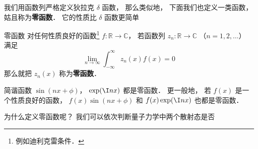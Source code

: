 
\begin{issues}
\issueDraft
{}
\end{issues}

我们用函数列严格定义狄拉克 $\delta$ 函数， 那么类似地， 下面我们也定义一类函数， 姑且称为\textbf{零函数}． 它的性质比 $\delta$ 函数更简单
\begin{definition}{零函数}
对任何性质良好的函数\footnote{例如迪利克雷条件．} $f: \mathbb R \to \mathbb C$， 若函数列 $z_n: \mathbb R \to \mathbb C$ （$n = 1, 2, \dots$） 满足
\begin{equation}
\lim_{n\to \infty}\int_{-\infty}^{\infty} z_n(x) f(x) = 0
\end{equation}
那么就把 $z_n(x)$ 称为\textbf{零函数}．
\end{definition}

\begin{example}{}
简谐函数 $\sin(nx + \phi)$， $\exp(\I n x)$ 都是零函数． 更一般地， 若 $f(x)$ 是一个性质良好的函数， $f(x)\sin(nx + \phi)$ 和 $f(x)\exp(\I n x)$ 也都是零函数．
\end{example}

为什么定义零函数呢？ 我们可以依次判断量子力学中两个散射态是否
